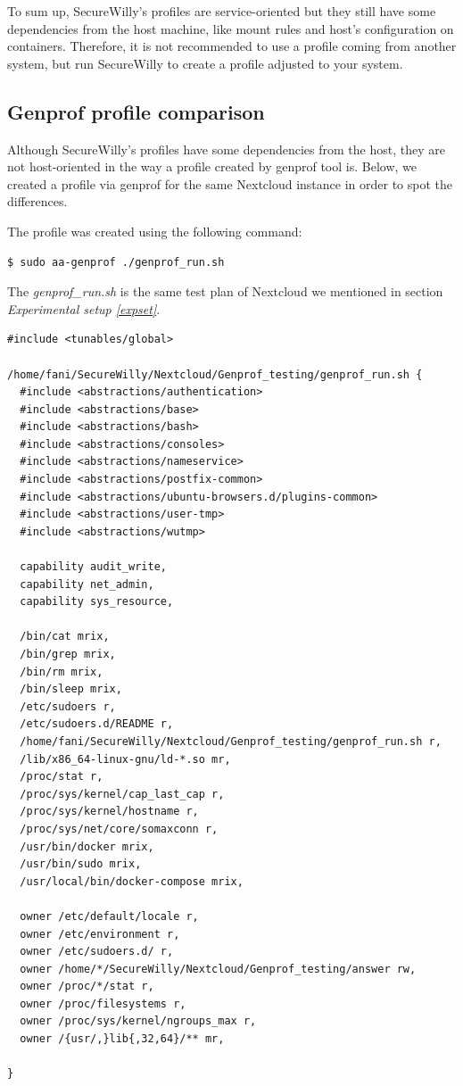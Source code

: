 \begin{mdframed}[backgroundcolor=navajowhite]
To sum up, SecureWilly's profiles are service-oriented but they still have some dependencies from the host machine, like mount rules and host's configuration on containers. Therefore, it is not recommended to use a profile coming from another system, but run SecureWilly to create a profile adjusted to your system.
\end{mdframed}

\subsection{Genprof profile comparison}\label{genprofcompare}
Although SecureWilly's profiles have some dependencies from the host, they are not host-oriented in the way a profile created by genprof tool is. Below, we created a profile via genprof for the same Nextcloud instance in order to spot the differences.

The profile was created using the following command:

\begin{lstlisting}[style=dockercommands]
$ sudo aa-genprof ./genprof_run.sh
\end{lstlisting}

The \textit{genprof\_run.sh} is the same test plan of Nextcloud we mentioned in section \textit{Experimental setup \ref{expset}}.
\hfill\break

\begin{lstlisting}[style=Dockerfile, caption={New AppArmor profile for nextcloud service: nextcloud\_profile}]
#include <tunables/global>

/home/fani/SecureWilly/Nextcloud/Genprof_testing/genprof_run.sh {
  #include <abstractions/authentication>
  #include <abstractions/base>
  #include <abstractions/bash>
  #include <abstractions/consoles>
  #include <abstractions/nameservice>
  #include <abstractions/postfix-common>
  #include <abstractions/ubuntu-browsers.d/plugins-common>
  #include <abstractions/user-tmp>
  #include <abstractions/wutmp>

  capability audit_write,
  capability net_admin,
  capability sys_resource,

  /bin/cat mrix,
  /bin/grep mrix,
  /bin/rm mrix,
  /bin/sleep mrix,
  /etc/sudoers r,
  /etc/sudoers.d/README r,
  /home/fani/SecureWilly/Nextcloud/Genprof_testing/genprof_run.sh r,
  /lib/x86_64-linux-gnu/ld-*.so mr,
  /proc/stat r,
  /proc/sys/kernel/cap_last_cap r,
  /proc/sys/kernel/hostname r,
  /proc/sys/net/core/somaxconn r,
  /usr/bin/docker mrix,
  /usr/bin/sudo mrix,
  /usr/local/bin/docker-compose mrix,

  owner /etc/default/locale r,
  owner /etc/environment r,
  owner /etc/sudoers.d/ r,
  owner /home/*/SecureWilly/Nextcloud/Genprof_testing/answer rw,
  owner /proc/*/stat r,
  owner /proc/filesystems r,
  owner /proc/sys/kernel/ngroups_max r,
  owner /{usr/,}lib{,32,64}/** mr,

}
\end{lstlisting}


